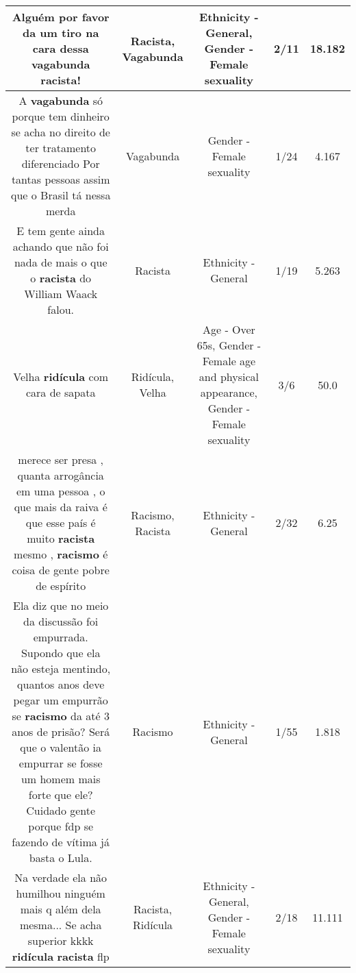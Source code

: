 \documentclass[11pt]{article}
\newlength\mylength
\begin{document}
\begin{center}
\begin{longtable}{|C{.65\mylength}|C{.30\mylength}|C{.12\mylength}|C{.12\mylength}|C{.12\mylength}|}
  \small Alguém por favor da um tiro na cara dessa \textbf{vagabunda} \textbf{racista}!\normalsize   & Racista, Vagabunda & Ethnicity - General, Gender - Female sexuality & 2/11 & 18.182 \\  \hline
  \small A \textbf{vagabunda} só porque tem dinheiro se acha no direito de ter tratamento diferenciado Por tantas pessoas assim que o Brasil tá nessa merda\normalsize   & Vagabunda & Gender - Female sexuality & 1/24 & 4.167 \\  \hline
  \small E tem gente ainda achando que não foi nada de mais o que o \textbf{racista} do William Waack falou.\normalsize   & Racista & Ethnicity - General & 1/19 & 5.263 \\  \hline
  \small Velha \textbf{ridícula} com cara de sapata\normalsize   & Ridícula, Velha & Age - Over 65s, Gender - Female age and physical appearance, Gender - Female sexuality & 3/6 & 50.0 \\  \hline
  \small merece ser presa , quanta arrogância em uma pessoa , o que  mais  da raiva  é que  esse  país é muito  \textbf{racista} mesmo , \textbf{racismo} é coisa de gente pobre de espírito\normalsize   & Racismo, Racista & Ethnicity - General & 2/32 & 6.25 \\  \hline
  \small Ela diz que no meio da discussão foi empurrada. Supondo que ela não esteja mentindo,  quantos anos deve pegar um empurrão se \textbf{racismo} da até 3 anos de prisão? Será que o valentão ia empurrar se fosse um homem mais forte que ele? Cuidado gente porque fdp se fazendo de vítima já basta o Lula.\normalsize   & Racismo & Ethnicity - General & 1/55 & 1.818 \\  \hline
  \small Na verdade ela não humilhou ninguém mais q além dela mesma... Se acha superior kkkk \textbf{ridícula} \textbf{racista} flp\normalsize   & Racista, Ridícula & Ethnicity - General, Gender - Female sexuality & 2/18 & 11.111 \\  \hline

\end{longtable}
\end{center}
\end{document}
